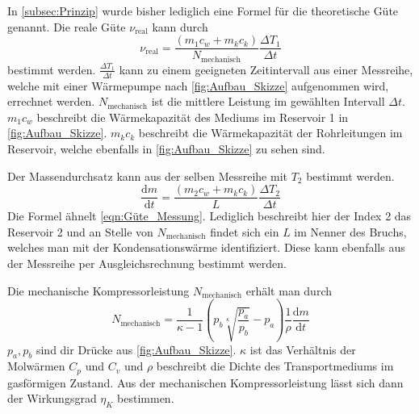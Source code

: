 In \autoref{subsec:Prinzip} wurde bisher lediglich eine Formel für die theoretische Güte genannt. Die reale Güte $\nu_{\text{real}}$ kann durch 
\begin{equation}
    \label{eqn:Güte_Messung}
    \nu_{\text{real}} = \frac{\left(m_1 c_w + m_k c_k\right)}{N_{\text{mechanisch}}}\frac{\Delta T_1}{\Delta t}
\end{equation}
bestimmt werden. $\frac{\Delta T_1}{\Delta t}$ kann zu einem geeigneten Zeitintervall aus einer Messreihe, welche mit einer Wärmepumpe nach \autoref{fig:Aufbau_Skizze} aufgenommen wird,
errechnet werden. $N_{\text{mechanisch}}$ ist die mittlere Leistung im gewählten Intervall $\Delta t$. $m_1c_w$ beschreibt die Wärmekapazität des Mediums im Reservoir 1 in \autoref{fig:Aufbau_Skizze}. 
$m_kc_k$ beschreibt die Wärmekapazität der Rohrleitungen im Reservoir, welche ebenfalls in \autoref{fig:Aufbau_Skizze} zu sehen sind.


Der Massendurchsatz kann aus der selben Messreihe mit $T_2$ bestimmt werden. 
\begin{equation}
    \label{eqn:Massendurchsatz}
    \frac{\text{d}m}{\text{d}t} = \frac{\left(m_2 c_w + m_k c_k\right)}{L}\frac{\Delta T_2}{\Delta t}
\end{equation}
Die Formel ähnelt \autoref{eqn:Güte_Messung}. Lediglich beschreibt hier der Index 2 das Reservoir 2 und an Stelle von $N_{\text{mechanisch}}$ findet sich ein $L$ 
im Nenner des Bruchs, welches man mit der Kondensationswärme identifiziert.
Diese kann ebenfalls aus der Messreihe per Ausgleichsrechnung bestimmt werden.


Die mechanische Kompressorleistung $N_{\text{mechanisch}}$ erhält man durch
\begin{equation}
    \label{eqn:Leistung}
    N_{\text{mechanisch}} = \frac{1}{\kappa - 1}\left(p_b \sqrt[\kappa]{\frac{p_a}{p_b}} - p_a \right) \frac{1}{\rho} \frac{\text{d}m}{\text{d}t}
\end{equation}
$p_a, p_b$ sind dir Drücke aus \autoref{fig:Aufbau_Skizze}. $\kappa$ ist das Verhältnis der Molwärmen $C_p$ und $C_v$ und $\rho$ beschreibt die Dichte des Transportmediums im gasförmigen
Zustand. Aus der mechanischen Kompressorleistung lässt sich dann der Wirkungsgrad $\eta_K$ bestimmen.
